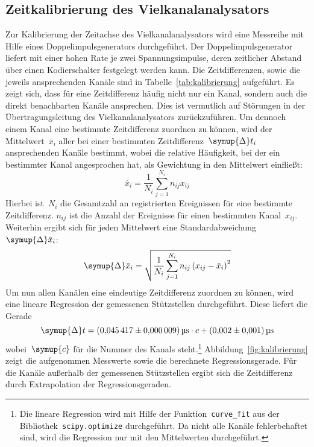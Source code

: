 \subsection{Zeitkalibrierung des Vielkanalanalysators}

Zur Kalibrierung der Zeitachse des Vielkanalanalysators wird eine Messreihe mit
Hilfe eines Doppelimpulsgenerators durchgeführt. Der Doppelimpulsgenerator
liefert mit einer hohen Rate je zwei Spannungsimpulse, deren zeitlicher Abstand
über einen Kodierschalter festgelegt werden kann. Die Zeitdifferenzen, sowie die
jeweils ansprechenden Kanäle sind in Tabelle~\ref{tab:kalibrierung} aufgeführt.
Es zeigt sich, dass für eine Zeitdifferenz häufig nicht nur ein Kanal, sondern
auch die direkt benachbarten Kanäle ansprechen. Dies ist vermutlich auf
Störungen in der Übertragungsleitung des Vielkanalanalysators zurückzuführen.
Um dennoch einem Kanal eine bestimmte Zeitdifferenz zuordnen zu können, wird der
Mittelwert~$\bar{x}_i$ aller bei einer bestimmten
Zeitdifferenz~$\symup{\Delta}t_i$ ansprechenden Kanäle bestimmt, wobei die
relative Häufigkeit, bei der ein bestimmter Kanal angesprochen hat, als
Gewichtung in den Mittelwert einfließt:
%
\begin{equation}
  \bar{x}_i=\frac{1}{N_i}\sum_{j=1}^{N_i}n_{ij}x_{ij}
  \label{eq:kanal_mittelwert}
\end{equation}
%
Hierbei ist~$N_i$ die Gesamtzahl an registrierten Ereignissen für eine bestimmte
Zeitdifferenz. $n_{ij}$ ist die Anzahl der Ereignisse für einen bestimmten
Kanal~$x_{ij}$. Weiterhin ergibt sich für jeden Mittelwert eine
Standardabweichung~$\symup{\Delta}\bar{x}_i$:
%
\begin{equation}
  \symup{\Delta}\bar{x}_i=\sqrt{\frac{1}{N_i}\sum_{j=1}^{N_i}n_{ij}\left(x_{ij}-\bar{x}_i\right)^2}
  \label{eq:kanal_standardabweichung}
\end{equation}
%
Um nun allen Kanälen eine eindeutige Zeitdifferenz zuordnen zu können, wird eine
lineare Regression der gemessenen Stützstellen durchgeführt. Diese liefert die
Gerade
%
\begin{equation}
  \symup{\Delta}t=\SI{0.045417(9)}{\micro\second}\cdot c+\SI{0.002(1)}{\micro\second}
  \label{eq:kalibrierung}
\end{equation}
%
wobei~$\symup{c}$ für die Nummer des Kanals steht.\footnote{Die lineare
Regression wird mit Hilfe der Funktion~\texttt{curve\_fit} aus der
Bibliothek~\texttt{scipy.optimize} durchgeführt. Da nicht alle Kanäle
fehlerbehaftet sind, wird die Regression nur mit den Mittelwerten durchgeführt.}
Abbildung~\ref{fig:kalibrierung} zeigt die aufgenommen Messwerte sowie die
berechnete Regressionsgerade. Für die Kanäle außerhalb der gemessenen
Stützstellen ergibt sich die Zeitdifferenz durch Extrapolation der
Regressionsgeraden.

